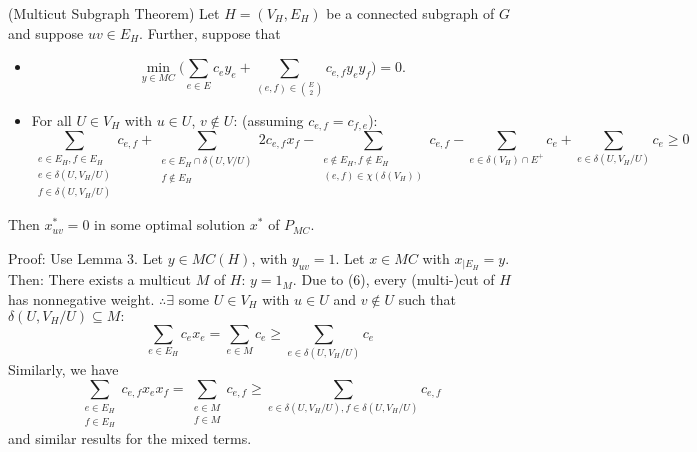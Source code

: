 \begin{theorem}{(Multicut Subgraph Theorem)}
Let $H=(V_H,E_H)$ be a connected subgraph of $G$ and suppose $uv \in E_H$. 
Further, suppose that 
\begin{itemize}
    \item 
    \begin{equation}
        \min_{y \in MC} \Big( \sum_{e \in E} c_e y_e + \sum_{(e,f) \in {E \choose 2}} c_{e,f} y_e y_f \Big) =0. 
    \end{equation} 
    \item For all $U \in V_H$ with $u \in U$, $v \notin U$: (assuming $c_{e,f}=c_{f,e}$): 
    \begin{equation}
        \sum_{ \substack{ e \in E_H, f \in E_H \\ e \in \delta(U,V_H/U) \\ f \in \delta(U, V_H/U)}} c_{e,f} +   \sum_{ \substack{ e \in E_H \cap \delta(U,V/U) \\ f \notin E_H}} 2c_{e,f}x_f  - \sum_{ \substack{ {e \notin E_H, f \notin E_H }  \\ (e,f) \in \chi(\delta(V_H)) }} c_{e,f} - \sum_{e \in \delta(V_H) \cap E^+} c_e + \sum_{e \in \delta(U,V_H/U)} c_e \geq 0 
    \end{equation}
\end{itemize}
Then $x^*_{uv}=0$ in some optimal solution $x^*$ of $P_{MC}$. 
\end{theorem}
Proof: Use Lemma 3. Let $y \in MC(H)$, with $y_{uv}=1$. Let $x \in MC$ with $x_{|E_H}=y$. Then: There exists a multicut $M$ of $H$: $y=1_M$. 
Due to (6), every (multi-)cut of $H$ has nonnegative weight. 
$\therefore \exists$ some $U \in V_H$ with $u \in U$ and $v \notin U$ such that $\delta(U,V_H/U) \subseteq M: $
\begin{equation}
    \sum_{e \in E_H} c_e x_e = \sum_{e \in M} c_e \geq \sum_{e \in \delta(U,V_H/U)} c_e 
\end{equation}
Similarly, we have 
\begin{equation}
    \sum_{ \substack{e \in E_H \\ f \in E_H}} c_{e,f} x_e x_f = \sum_{\substack{e \in M \\ f \in M} } c_{e,f} \geq \sum_{e \in \delta(U,V_H/U), f \in \delta(U,V_H/U)} c_{e,f} 
\end{equation}
and similar results for the mixed terms. 

